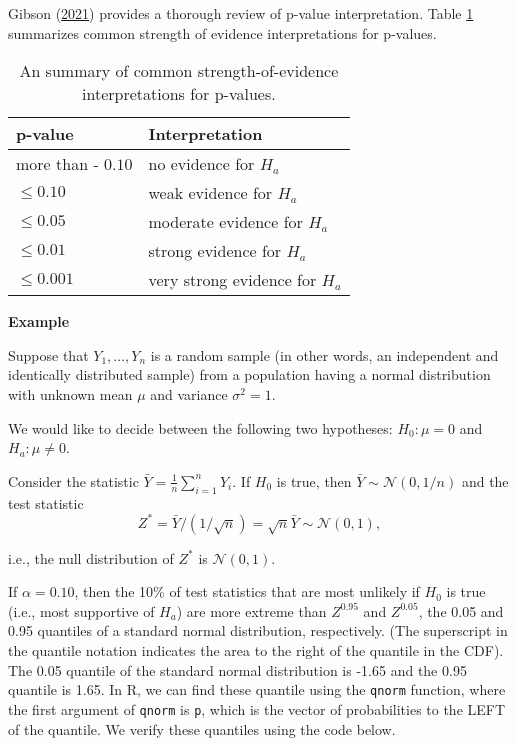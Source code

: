 \documentclass[
]{book}
\theoremstyle{definition}
\theoremstyle{definition}
\theoremstyle{definition}
\theoremstyle{definition}
\theoremstyle{remark}
\begin{document}
Gibson (\protect\hyperlink{ref-gibson_pvalue}{2021}) provides a thorough review of p-value interpretation.
Table \ref{tab:pvalue-interp} summarizes common strength of evidence
interpretations for p-values.

\begin{table}

\caption{\label{tab:pvalue-interp}An summary of common strength-of-evidence interpretations for p-values.}
\centering
\begin{tabular}[t]{l>{\raggedright\arraybackslash}p{3in}}
\toprule
p-value & Interpretation\\
\midrule
more than -
                              $0.10$ & no evidence for $H_a$\\
$\leq 0.10$ & weak evidence for $H_a$\\
$\leq 0.05$ & moderate evidence for $H_a$\\
$\leq 0.01$ & strong evidence for $H_a$\\
$\leq 0.001$ & very strong evidence for $H_a$\\
\bottomrule
\end{tabular}
\end{table}

\textbf{Example}

Suppose that \(Y_1,\ldots,Y_n\) is a random sample (in other words,
an independent and identically distributed sample) from a population having
a normal distribution with unknown mean \(\mu\) and variance \(\sigma^2=1\).

We would like to decide between the following two hypotheses:
\(H_0:\mu=0\) and \(H_a:\mu\neq 0\).

Consider the statistic \(\bar{Y} = \frac{1}{n} \sum_{i=1}^n Y_i\). If \(H_0\) is true, then \(\bar{Y} \sim \mathcal{N}(0,1/n)\) and the test statistic
\[
Z^*=\bar{Y}/(1/\sqrt{n})=\sqrt{n}\bar{Y}\sim \mathcal{N}(0, 1),
\]

i.e., the null distribution of \(Z^*\) is \(\mathcal{N}(0,1)\).

If \(\alpha=0.10\), then the 10\% of test statistics that are most unlikely if \(H_0\)
is true (i.e., most supportive of \(H_a\)) are more extreme than \(Z^{0.95}\) and \(Z^{0.05}\), the 0.05 and 0.95 quantiles of a standard
normal distribution, respectively. (The superscript in the quantile notation indicates the area to the right of the quantile in the CDF). The 0.05 quantile of the standard normal distribution is -1.65 and the 0.95 quantile is 1.65. In R, we can find these quantile using the \texttt{qnorm} function, where the first argument of \texttt{qnorm} is \texttt{p}, which is the vector of probabilities to the LEFT of the quantile. We verify these quantiles using the code below.
\end{document}
